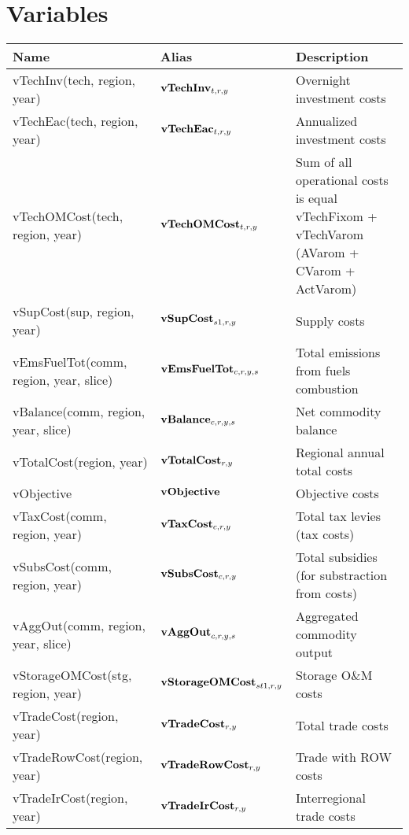 \documentclass{article}
\begin{document}
\section*{Variables}
\begin{longtable}{|p{10cm}|p{5cm}|p{9cm}|}
\hline
\bf{Name} & \bf{Alias}   & \bf{Description} \\ 
 \hline
vTechInv(tech, region, year) & ${\bf vTechInv}_{t,r,y}$ & Overnight investment costs \\ 
 \hline
vTechEac(tech, region, year) & ${\bf vTechEac}_{t,r,y}$ & Annualized investment costs \\ 
 \hline
vTechOMCost(tech, region, year) & ${\bf vTechOMCost}_{t,r,y}$ & Sum of all operational costs is equal vTechFixom + vTechVarom (AVarom + CVarom + ActVarom) \\ 
 \hline
vSupCost(sup, region, year) & ${\bf vSupCost}_{s1,r,y}$ & Supply costs \\ 
 \hline
vEmsFuelTot(comm, region, year, slice) & ${\bf vEmsFuelTot}_{c,r,y,s}$ & Total emissions from fuels combustion \\ 
 \hline
vBalance(comm, region, year, slice) & ${\bf vBalance}_{c,r,y,s}$ & Net commodity balance \\ 
 \hline
vTotalCost(region, year) & ${\bf vTotalCost}_{r,y}$ & Regional annual total costs \\ 
 \hline
vObjective & ${\bf vObjective}$ & Objective costs \\ 
 \hline
vTaxCost(comm, region, year) & ${\bf vTaxCost}_{c,r,y}$ & Total tax levies (tax costs) \\ 
 \hline
vSubsCost(comm, region, year) & ${\bf vSubsCost}_{c,r,y}$ & Total subsidies (for substraction from costs) \\ 
 \hline
vAggOut(comm, region, year, slice) & ${\bf vAggOut}_{c,r,y,s}$ & Aggregated commodity output \\ 
 \hline
vStorageOMCost(stg, region, year) & ${\bf vStorageOMCost}_{st1,r,y}$ & Storage O\&M costs \\ 
 \hline
vTradeCost(region, year) & ${\bf vTradeCost}_{r,y}$ & Total trade costs \\ 
 \hline
vTradeRowCost(region, year) & ${\bf vTradeRowCost}_{r,y}$ & Trade with ROW costs \\ 
 \hline
vTradeIrCost(region, year) & ${\bf vTradeIrCost}_{r,y}$ & Interregional trade costs \\ 
 \hline
\end{longtable}
\end{document}
